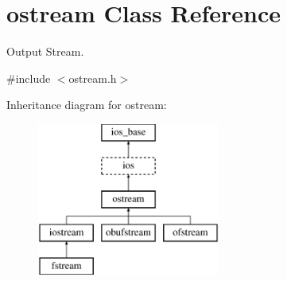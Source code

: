 \hypertarget{classostream}{}\section{ostream Class Reference}
\label{classostream}


Output Stream.  




{\ttfamily \#include $<$ostream.\+h$>$}

Inheritance diagram for ostream\+:\begin{figure}[H]
\begin{center}
\leavevmode
\includegraphics[height=5.000000cm]{classostream}
\end{center}
\end{figure}
